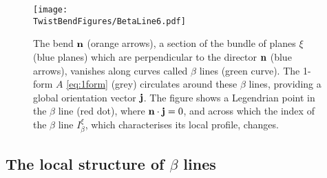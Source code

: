\begin{figure}[htbp]
    \centering
    \texttt{[image: \\TwistBendFigures/BetaLine6.pdf]}
    \caption{The bend $\mathbf{n}$ (orange arrows), a section of the bundle of planes $\xi$ (blue planes) which are perpendicular to the director $\mathbf{n}$ (blue arrows), vanishes along curves called $\beta$ lines (green curve). The 1-form $A$ \eqref{eq:1form} (grey) circulates around these $\beta$ lines, providing a global orientation vector $\mathbf{j}$. The figure shows a Legendrian point in the $\beta$ line (red dot), where $\mathbf{n} \cdot \mathbf{j} =0$, and across which the index of the $\beta$ line $I_\beta^\xi$, which characterises its local profile, changes.}
    \label{fig:BetaLines}
\end{figure}

\subsection{The local structure of $\beta$ lines}
\label{subsec:BendLocalStructure}
